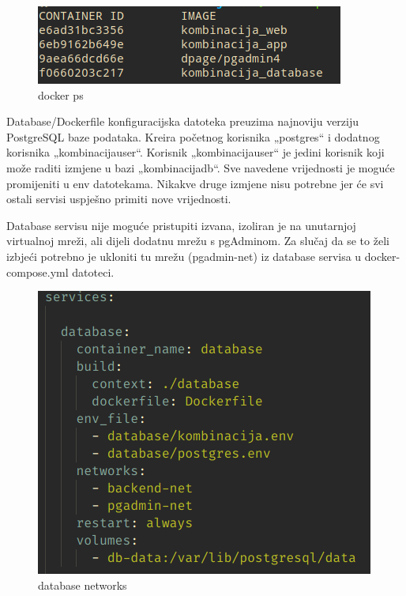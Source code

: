 		\begin{figure}[H]
					\includegraphics[scale=1]{figures/2-ps.PNG}
					\centering
					\caption{docker ps}
					\label{fig:sekv-uc13}
				\end{figure}
						
				
				
				
				
		Database/Dockerfile konfiguracijska datoteka preuzima najnoviju verziju PostgreSQL baze podataka. Kreira početnog korisnika „postgres“ i dodatnog korisnika „kombinacijauser“. Korisnik „kombinacijauser“ je jedini korisnik koji može raditi izmjene u bazi „kombinacijadb“. Sve navedene vrijednosti je moguće promijeniti u env datotekama. Nikakve druge izmjene nisu potrebne jer će svi ostali servisi uspješno primiti nove vrijednosti.

		Database servisu nije moguće pristupiti izvana, izoliran je na unutarnjoj virtualnoj mreži, ali dijeli dodatnu mrežu s pgAdminom. Za slučaj da se to želi izbjeći potrebno je ukloniti tu mrežu (pgadmin-net) iz database servisa u docker-compose.yml datoteci.	
			
			
						
		\begin{figure}[H]
					\includegraphics[scale=0.9]{figures/initdb.PNG}
					\centering
					\caption{database networks}
					\label{fig:sekv-uc13}
				\end{figure}
						
